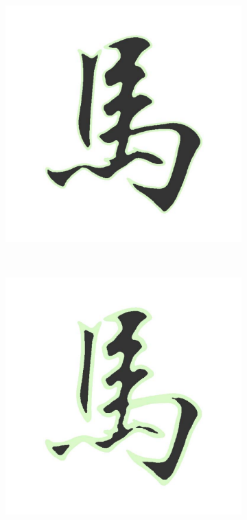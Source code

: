 \documentclass[review]{acmsiggraph}
\begin{document}
\begin{figure}
\begin{subfigure}[b]{0.18\linewidth}
        \end{subfigure}
        ~
		\begin{subfigure}[b]{0.18\linewidth}
                \centering
                \includegraphics[width=\textwidth]{images/horse/horse-contour-0d25.pdf}
        \end{subfigure}
		~
		\begin{subfigure}[b]{0.18\linewidth}
                \centering
                \includegraphics[width=\textwidth]{images/horse/horse-contour-0d5.pdf}

\end{subfigure}
\end{figure}
\end{document}
